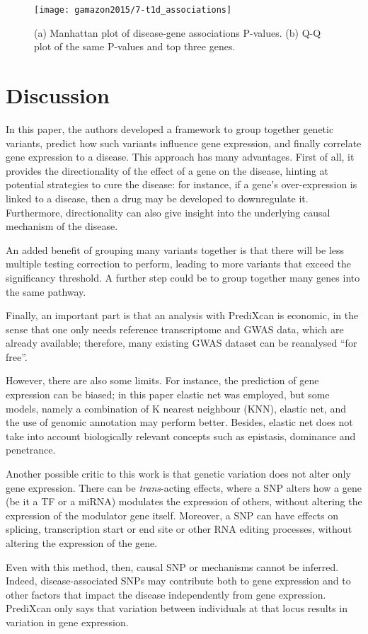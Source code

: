 \documentclass[../main.tex]{subfiles}
\begin{document}
\begin{figure}
	\texttt{[image: gamazon2015/7-t1d\_associations]}
	\caption{(a) Manhattan plot of disease-gene associations P-values. 
(b) Q-Q plot of the same P-values and top three genes.}
\end{figure}

\section{Discussion}

In this paper, the authors developed a framework to group together 
genetic variants, predict how such variants influence gene expression, 
and finally correlate gene expression to a disease. This approach has 
many advantages. First of all, it provides the directionality of the 
effect of a gene on the disease, hinting at potential strategies to cure 
the disease: for instance, if a gene's over-expression is linked to a 
disease, then a drug may be developed to downregulate it. Furthermore, 
directionality can also give insight into the underlying causal 
mechanism of the disease.

An added benefit of grouping many variants together is that there will 
be less multiple testing correction to perform, leading to more variants 
that exceed the significancy threshold. A further step could be to group 
together many genes into the same pathway.

Finally, an important part is that an analysis with PrediXcan is 
economic, in the sense that one only needs reference transcriptome and 
GWAS data, which are already available; therefore, many existing GWAS 
dataset can be reanalysed \enquote{for free}.

However, there are also some limits. For instance, the prediction of 
gene expression can be biased; in this paper elastic net was employed, 
but some models, namely a combination of K nearest neighbour (KNN), 
elastic net, and the use of genomic annotation may perform better. 
Besides, elastic net does not take into account biologically relevant 
concepts such as epistasis, dominance and penetrance.

Another possible critic to this work is that genetic variation does not 
alter only gene expression. There can be \textit{trans}-acting effects, 
where a SNP alters how a gene (be it a TF or a miRNA) modulates the 
expression of others, without altering the expression of the modulator 
gene itself. Moreover, a SNP can have effects on splicing, transcription 
start or end site or other RNA editing processes, without altering the 
expression of the gene.

Even with this method, then, causal SNP or mechanisms cannot be 
inferred. Indeed, disease-associated SNPs may contribute both to gene 
expression and to other factors that impact the disease independently 
from gene expression. PrediXcan  only says that variation between 
individuals at that locus results in variation in gene 
expression.
\end{document}
